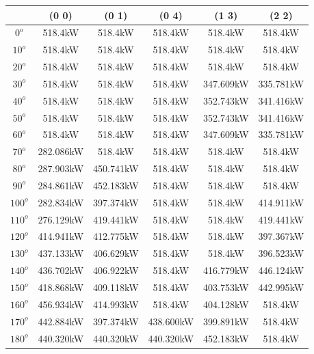         \singlespacing
        \begin{table}[H]
        	\centering
        	\begin{tabular}{|c|c|c|c|c|c|} \hline
        			& (0 0)		& (0 1)		& (0 4)		& (1 3)		& (2 2)		\\ \hline
        		$0^o$	& 518.4kW	& 518.4kW	& 518.4kW	& 518.4kW	& 518.4kW	\\ \hline
        		$10^o$	& 518.4kW	& 518.4kW	& 518.4kW	& 518.4kW	& 518.4kW	\\ \hline
        		$20^o$	& 518.4kW	& 518.4kW	& 518.4kW	& 518.4kW	& 518.4kW	\\ \hline
        		$30^o$	& 518.4kW	& 518.4kW	& 518.4kW	& 347.609kW	& 335.781kW	\\ \hline
        		$40^o$	& 518.4kW	& 518.4kW	& 518.4kW	& 352.743kW	& 341.416kW	\\ \hline
        		$50^o$	& 518.4kW	& 518.4kW	& 518.4kW	& 352.743kW	& 341.416kW	\\ \hline
        		$60^o$	& 518.4kW	& 518.4kW	& 518.4kW	& 347.609kW	& 335.781kW	\\ \hline
        		$70^o$	& 282.086kW	& 518.4kW	& 518.4kW	& 518.4kW	& 518.4kW	\\ \hline
        		$80^o$	& 287.903kW	& 450.741kW	& 518.4kW	& 518.4kW	& 518.4kW	\\ \hline
        		$90^o$	& 284.861kW	& 452.183kW	& 518.4kW	& 518.4kW	& 518.4kW	\\ \hline
        		$100^o$	& 282.834kW	& 397.374kW	& 518.4kW	& 518.4kW	& 414.911kW	\\ \hline
        		$110^o$	& 276.129kW	& 419.441kW	& 518.4kW	& 518.4kW	& 419.441kW	\\ \hline
        		$120^o$	& 414.941kW	& 412.775kW	& 518.4kW	& 518.4kW	& 397.367kW	\\ \hline
        		$130^o$	& 437.133kW	& 406.629kW	& 518.4kW	& 518.4kW	& 396.523kW	\\ \hline
        		$140^o$	& 436.702kW	& 406.922kW	& 518.4kW	& 416.779kW	& 446.124kW	\\ \hline
        		$150^o$	& 418.868kW	& 409.118kW	& 518.4kW	& 403.753kW	& 442.995kW	\\ \hline
        		$160^o$	& 456.934kW	& 414.993kW	& 518.4kW	& 404.128kW	& 518.4kW	\\ \hline
        		$170^o$	& 442.884kW	& 397.374kW	& 438.600kW	& 399.891kW	& 518.4kW	\\ \hline
        		$180^o$	& 440.320kW	& 440.320kW	& 440.320kW	& 452.183kW	& 518.4kW	\\ \hline

\end{tabular}
\end{table}
